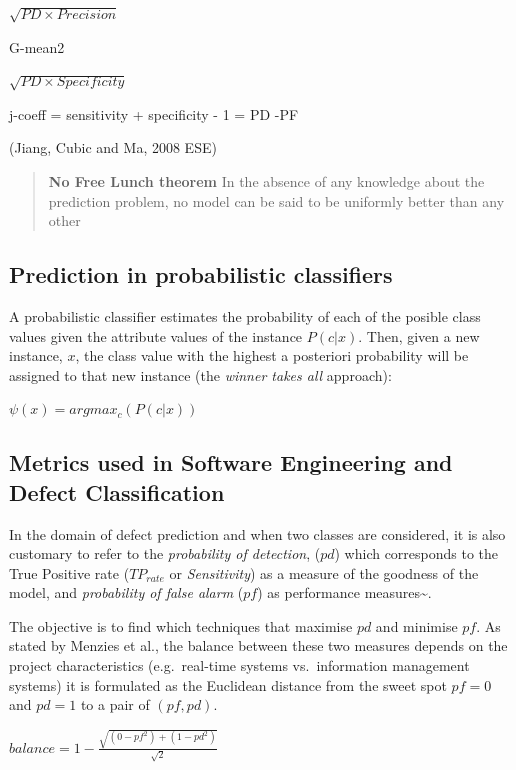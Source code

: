 \documentclass[]{book}
\theoremstyle{definition}
\theoremstyle{definition}
\theoremstyle{remark}
\begin{document}
{\(\sqrt{PD \times Precision}\)

G-mean2

\(\sqrt{PD \times Specificity}\)

j-coeff = sensitivity + specificity - 1 = PD -PF

(Jiang, Cubic and Ma, 2008 ESE)

\begin{quote}
\textbf{No Free Lunch theorem} In the absence of any knowledge about the
prediction problem, no model can be said to be uniformly better than any
other
\end{quote}

\subsection{Prediction in probabilistic
classifiers}\label{prediction-in-probabilistic-classifiers}

A probabilistic classifier estimates the probability of each of the
posible class values given the attribute values of the instance
\(P(c|{x})\). Then, given a new instance, \({x}\), the class value with
the highest a posteriori probability will be assigned to that new
instance (the \emph{winner takes all} approach):

\(\psi({x}) = argmax_c (P(c|{x}))\)

\subsection{Metrics used in Software Engineering and Defect
Classification}\label{metrics-used-in-software-engineering-and-defect-classification}

In the domain of defect prediction and when two classes are considered,
it is also customary to refer to the \emph{probability of detection},
(\(pd\)) which corresponds to the True Positive rate (\(TP_{rate}\) or
\emph{Sensitivity}) as a measure of the goodness of the model, and
\emph{probability of false alarm} (\(pf\)) as performance
measures\textasciitilde{}\cite{Menzies07}.

The objective is to find which techniques that maximise \(pd\) and
minimise \(pf\). As stated by Menzies et al., the balance between these
two measures depends on the project characteristics (e.g.~real-time
systems vs.~information management systems) it is formulated as the
Euclidean distance from the sweet spot \(pf=0\) and \(pd=1\) to a pair
of \((pf,pd)\).

\(balance=1-\frac{\sqrt{(0-pf^2)+(1-pd^2)}}{\sqrt{2}}\)

}
\end{document}
